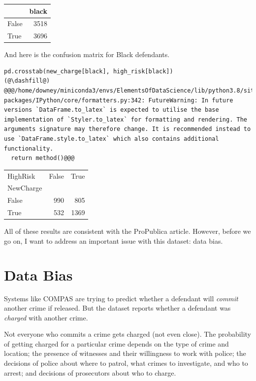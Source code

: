 \begin{tabular}{lr}
\midrule
{} &  black \\
\midrule
False &   3518 \\
True  &   3696 \\
\midrule
\end{tabular}

And here is the confusion matrix for Black defendants.

\begin{lstlisting}[]
pd.crosstab(new_charge[black], high_risk[black])
(@\dashfill@)
@@@/home/downey/miniconda3/envs/ElementsOfDataScience/lib/python3.8/site-packages/IPython/core/formatters.py:342: FutureWarning: In future versions `DataFrame.to_latex` is expected to utilise the base implementation of `Styler.to_latex` for formatting and rendering. The arguments signature may therefore change. It is recommended instead to use `DataFrame.style.to_latex` which also contains additional functionality.
  return method()@@@
\end{lstlisting}

\begin{tabular}{lrr}
\midrule
HighRisk &  False &  True  \\
NewCharge &        &        \\
\midrule
False     &    990 &    805 \\
True      &    532 &   1369 \\
\midrule
\end{tabular}

All of these results are consistent with the ProPublica article.
However, before we go on, I want to address an important issue with this
dataset: data bias.

\hypertarget{data-bias}{%
\section{Data Bias}\label{data-bias}}

Systems like COMPAS are trying to predict whether a defendant will
\emph{commit} another crime if released. But the dataset reports whether
a defendant was \emph{charged} with another crime.

Not everyone who commits a crime gets charged (not even close). The
probability of getting charged for a particular crime depends on the
type of crime and location; the presence of witnesses and their
willingness to work with police; the decisions of police about where to
patrol, what crimes to investigate, and who to arrest; and decisions of
prosecutors about who to charge.

